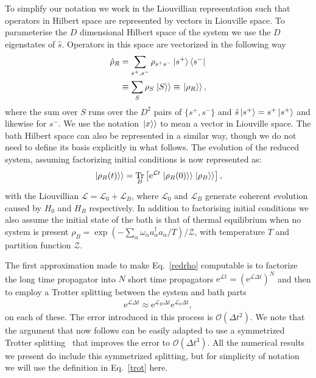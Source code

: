 \documentclass[a4paper, aps, pra,twocolumn]{revtex4-1}
\newcommand{\dket}[1]{\left.\Ket{#1}\right\rangle}
\DeclareMathOperator\Tr{\mathrm{Tr}}%
\begin{document}
To simplify our notation we work in the Liouvillian representation such that operators in Hilbert space are represented by vectors in Liouville space. To parameterise the $D$ dimensional Hilbert space of the system we use the $D$ eigenstates of $\hat{s}$. Operators in this space are vectorized in the following way
\begin{align}
\hat{\rho}_R&=\sum_{s^+, s^-}\rho_{s^+ s^-}\ket{s^+}\bra{s^-} \nonumber\\
&\equiv\sum_{S} \rho_S\dket{S}\equiv\dket{\rho_R},
\end{align}
where the sum over $S$ runs over the $D^2$ pairs of $\{s^+,s^-\}$ and $\hat{s}\ket{s^+}=s^+\ket{s^+}$ and likewise for $s^-$. We use the notation $\dket{x}$ to mean a vector in Liouville space.
The bath Hilbert space can also be represented in a similar way, though we do not need to define its basis explicitly in what follows.
The evolution of the reduced system, assuming factorizing initial conditions is now represented as:
\begin{align}
\label{redrho}
\dket{\rho_R(t)}=\Tr_B\left[\text{e}^{\mathcal{L} t}\dket{\rho_R(0)}\dket{\rho_B}\right],
\end{align}
with the Liouvillian $\mathcal{L}=\mathcal{L}_0+\mathcal{L}_B$, where $\mathcal{L}_0$ and $\mathcal{L}_B$ generate coherent evolution caused by $H_0$ and $H_B$ respectively.
In addition to factorising initial conditions we also assume the initial state of the bath is that of thermal equilibrium when no system is present $\rho_B=\exp(-\sum_\alpha \omega_\alpha a^\dagger_\alpha a_\alpha/T)/\mathcal{Z}$, with  temperature $T$ and partition function $\mathcal{Z}$.


The first approximation made to make  Eq.~\eqref{redrho} computable is to factorize the long time propagator into $N$ short time propagators $\text{e}^{\mathcal{L} t}=(\text{e}^{\mathcal{L} \Delta t})^N$ and then to employ a Trotter splitting between the system and bath parts~\cite{trotter1959}
\begin{align}
\label{trot}
\text{e}^{\mathcal{L} \Delta t}\approx \text{e}^{\mathcal{L}_B \Delta t}\text{e}^{\mathcal{L}_0 \Delta t},
\end{align}
on each of these. The error introduced in this process is $\mathcal{O}(\Delta t^2)$.
We note that the argument that now follows can be easily adapted to use a symmetrized Trotter splitting~\cite{suzuki1976,makri_makarov_1995_i,makri_makarov_1995_ii} that improves the error to $\mathcal{O}(\Delta t^3)$. All the numerical results we present do include this symmetrized splitting, but for simplicity of notation we will use the definition in Eq.~\ref{trot} here.
\end{document}
